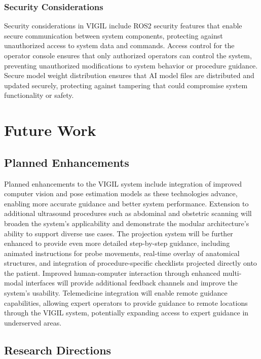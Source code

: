 \documentclass[12pt,a4paper]{article}
\begin{document}
\subsubsection{Security Considerations}

Security considerations in VIGIL include ROS2 security features that enable secure communication between system components, protecting against unauthorized access to system data and commands. Access control for the operator console ensures that only authorized operators can control the system, preventing unauthorized modifications to system behavior or procedure guidance. Secure model weight distribution ensures that AI model files are distributed and updated securely, protecting against tampering that could compromise system functionality or safety.

\section{Future Work}

\subsection{Planned Enhancements}

Planned enhancements to the VIGIL system include integration of improved computer vision and pose estimation models as these technologies advance, enabling more accurate guidance and better system performance. Extension to additional ultrasound procedures such as abdominal and obstetric scanning will broaden the system's applicability and demonstrate the modular architecture's ability to support diverse use cases. The projection system will be further enhanced to provide even more detailed step-by-step guidance, including animated instructions for probe movements, real-time overlay of anatomical structures, and integration of procedure-specific checklists projected directly onto the patient. Improved human-computer interaction through enhanced multi-modal interfaces will provide additional feedback channels and improve the system's usability. Telemedicine integration will enable remote guidance capabilities, allowing expert operators to provide guidance to remote locations through the VIGIL system, potentially expanding access to expert guidance in underserved areas.

\subsection{Research Directions}
\end{document}
